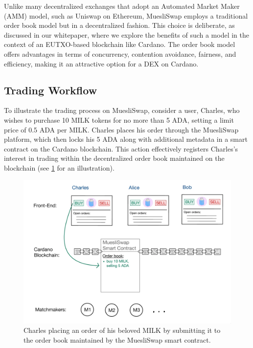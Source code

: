 \documentclass[11pt]{article}
\begin{document}
Unlike many decentralized exchanges that adopt an Automated Market Maker (AMM) model, such as Uniswap on Ethereum, MuesliSwap employs a traditional order book model but in a decentralized fashion. This choice is deliberate, as discussed in our whitepaper, where we explore the benefits of such a model in the context of an EUTXO-based blockchain like Cardano. The order book model offers advantages in terms of concurrency, contention avoidance, fairness, and efficiency, making it an attractive option for a DEX on Cardano.

\subsection{Trading Workflow}
To illustrate the trading process on MuesliSwap, consider a user, Charles, who wishes to purchase 10 MILK tokens for no more than 5 ADA, setting a limit price of 0.5 ADA per MILK. Charles places his order through the MuesliSwap platform, which then locks his 5 ADA along with additional metadata in a smart contract on the Cardano blockchain. This action effectively registers Charles's interest in trading within the decentralized order book maintained on the blockchain (see \ref{fig:illustration1} for an illustration). 

\begin{figure}[H]
    \centering
    \includegraphics[scale=0.18]{illustration1.png}
    \caption{Charles placing an order of his beloved MILK by submitting it to the order book maintained by the MuesliSwap smart contract.}
    \label{fig:illustration1}
\end{figure}
\end{document}
